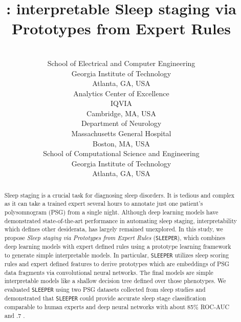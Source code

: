 \documentclass[pmlr]{jmlr}
\title[\mname]{\mname: interpretable Sleep staging via Prototypes from Expert Rules}
\author{\Name{Irfan Al-Hussaini} \Email{alhussaini.irfan@gatech.edu} \\
      \addr School of Electrical and Computer Engineering\\
      Georgia Institute of Technology\\
      Atlanta, GA, USA
      \AND
      \Name{Cao Xiao} \Email{cao.xiao@iqvia.com} \\
      \addr Analytics Center of Excellence\\
      IQVIA\\
      Cambridge, MA, USA
      \AND
      \Name{M. Brandon Westover} \Email{mwestover@mgh.harvard.edu} \\
      \addr Department of Neurology\\
      Massachusetts General Hospital\\
      Boston, MA, USA 
      \AND
      \Name{Jimeng Sun} \Email{jsun@cc.gatech.edu} \\
      \addr School of Computational Science and Engineering\\
      Georgia Institute of Technology\\
      Atlanta, GA, USA}
\newcommand{\mname}
{\texttt{SLEEPER}\xspace}
\begin{document}
\maketitle

\begin{abstract}
Sleep staging is a crucial task for diagnosing sleep disorders. It is tedious and complex as it can take a trained expert several hours to  annotate just one patient's polysomnogram (PSG) from a single night. Although deep learning models have demonstrated state-of-the-art performance in automating sleep staging, interpretability which defines other desiderata, has largely remained unexplored. In this study, 
we propose {\it Sleep staging via Prototypes from Expert Rules} (\mname), which combines deep learning models with expert defined rules using a prototype learning framework to generate simple interpretable models.
In particular, \mname utilizes sleep scoring rules and expert defined features to derive prototypes which are embeddings of PSG data fragments via convolutional neural networks. The final models are simple interpretable models like a shallow decision tree defined over those phenotypes. We evaluated \mname using two PSG datasets collected from sleep studies and demonstrated that \mname could provide accurate sleep stage classification comparable to human experts and deep neural networks with about 85\% ROC-AUC and .7 . 





\end{abstract}
\end{document}
